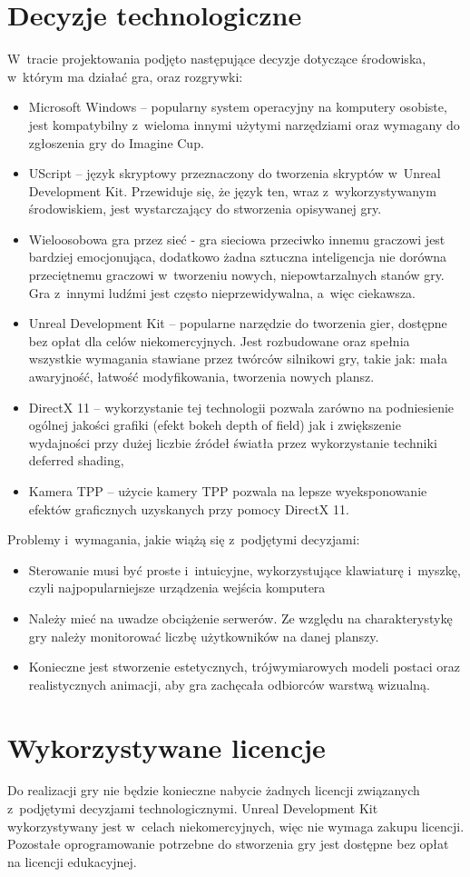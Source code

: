 \section{Decyzje technologiczne}
W~tracie projektowania podjęto następujące decyzje dotyczące środowiska, w~którym ma działać gra, oraz rozgrywki:
\begin{itemize}
\item Microsoft Windows -- popularny system operacyjny na komputery osobiste, jest kompatybilny z~wieloma innymi użytymi narzędziami oraz wymagany do zgłoszenia gry do Imagine Cup.
\item UScript -- język skryptowy przeznaczony do tworzenia skryptów w~Unreal Development Kit. Przewiduje się, że język ten, wraz z~wykorzystywanym środowiskiem, jest wystarczający do stworzenia opisywanej gry.
\item Wieloosobowa gra przez sieć - gra sieciowa przeciwko innemu graczowi jest bardziej emocjonująca, dodatkowo żadna sztuczna inteligencja nie dorówna przeciętnemu graczowi w~tworzeniu nowych, niepowtarzalnych stanów gry. Gra z~innymi ludźmi jest często nieprzewidywalna, a~więc ciekawsza.
\item Unreal Development Kit -- popularne narzędzie do tworzenia gier, dostępne bez opłat dla celów niekomercyjnych. Jest rozbudowane oraz spełnia wszystkie wymagania stawiane przez twórców silnikowi gry, takie jak: mała awaryjność, łatwość modyfikowania, tworzenia nowych plansz.
\item DirectX 11 -- wykorzystanie tej technologii pozwala zarówno na podniesienie ogólnej jakości grafiki (efekt bokeh depth of field) jak i zwiększenie wydajności przy dużej liczbie źródeł światła przez wykorzystanie techniki deferred shading,
\item Kamera TPP -- użycie kamery TPP pozwala na lepsze wyeksponowanie efektów graficznych uzyskanych przy pomocy DirectX 11.
\end{itemize}

Problemy i~wymagania, jakie wiążą się z~podjętymi decyzjami:
\begin{itemize}
\item Sterowanie musi być proste i~intuicyjne, wykorzystujące klawiaturę i~myszkę, czyli najpopularniejsze urządzenia wejścia komputera
\item Należy mieć na uwadze obciążenie serwerów. Ze względu na charakterystykę gry należy monitorować liczbę użytkowników na danej planszy.
\item Konieczne jest stworzenie estetycznych, trójwymiarowych modeli postaci oraz realistycznych animacji, aby gra zachęcała odbiorców warstwą wizualną.
\end{itemize}

\section{Wykorzystywane licencje}
Do realizacji gry nie będzie konieczne nabycie żadnych licencji związanych z~podjętymi decyzjami technologicznymi. Unreal Development Kit wykorzystywany jest w~celach niekomercyjnych, więc nie wymaga zakupu licencji. Pozostałe oprogramowanie potrzebne do stworzenia gry jest dostępne bez opłat na licencji edukacyjnej.

